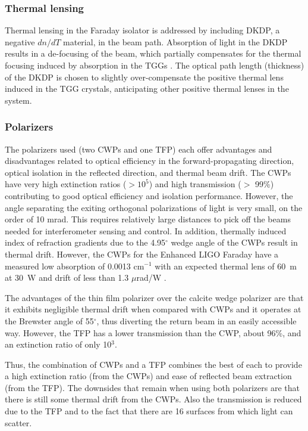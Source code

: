 \subsubsection{Thermal lensing}  
Thermal lensing in the Faraday isolator is addressed by including
DKDP, a negative $dn/dT$ material, in the beam path. Absorption of
light in the DKDP results in a de-focusing of the beam, which
partially compensates for the thermal focusing induced by absorption
in the TGGs \citep{Mueller2002Method, Khazanov2004Compensation}.  The
optical path length (thickness) of the DKDP is chosen to slightly
over-compensate the positive thermal lens induced in the TGG crystals,
anticipating other positive thermal lenses in the system.

\subsubsection{Polarizers}  
The polarizers used (two CWPs and one TFP) each offer advantages and
disadvantages related to optical efficiency in the forward-propagating
direction, optical isolation in the reflected direction, and thermal
beam drift. The CWPs have very high extinction ratios ($>10^5$) and
high transmission ($>$ 99\%) contributing to good optical efficiency
and isolation performance. However, the angle separating the exiting
orthogonal polarizations of light is very small, on the order of 10
mrad. This requires relatively large distances to pick off the beams
needed for interferometer sensing and control. In addition, thermally
induced index of refraction gradients due to the 4.95$^{\circ}$ wedge
angle of the CWPs result in thermal drift. However, the CWPs for the
Enhanced LIGO Faraday have a measured low absorption of 0.0013
cm$^{-1}$
with an expected thermal lens of 60~m at 30~W and drift of less than
1.3 $\mu$rad/W \citep{UFLIGOGroup2006Upgrading}.

The advantages of the thin film polarizer over the calcite wedge
polarizer are that it exhibits negligible thermal drift when compared
with CWPs and it operates at the Brewster angle of 55$^\circ$, thus
diverting the return beam in an easily accessible way. However, the
TFP has a lower transmission than the CWP, about 96\%, and an
extinction ratio of only 10$^3$.

Thus, the combination of CWPs and a TFP combines the best of each to
provide a high extinction ratio (from the CWPs) and ease of reflected
beam extraction (from the TFP). The downsides that remain when using
both polarizers are that there is still some thermal drift from the
CWPs. Also the transmission is reduced due to the TFP and to the fact
that there are 16 surfaces from which light can scatter.

